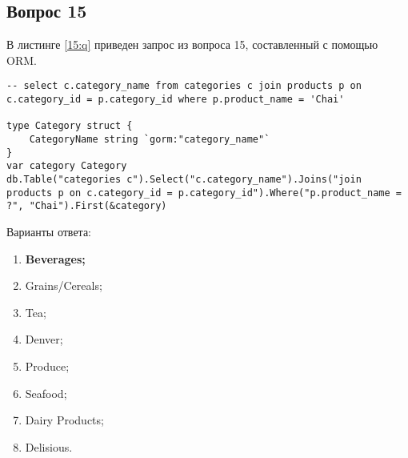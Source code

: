 \begin{appendices}
%
%
%
%
%

\section{Вопрос 15}

В листинге \ref{15:q} приведен запрос из вопроса 15, составленный с помощью ORM.

\begin{lstlisting}[label=15:q,caption=Вопрос 15]
-- select c.category_name from categories c join products p on c.category_id = p.category_id where p.product_name = 'Chai'

type Category struct {
	CategoryName string `gorm:"category_name"`
}
var category Category
db.Table("categories c").Select("c.category_name").Joins("join products p on c.category_id = p.category_id").Where("p.product_name = ?", "Chai").First(&category)
\end{lstlisting}

Варианты ответа:

\begin{enumerate}
	\item \textbf{Beverages;}
	\item Grains/Cereals;
	\item Tea;
	\item Denver;
	\item Produce;
	\item Seafood;
	\item Dairy Products;
	\item Delisious.
\end{enumerate}


\end{appendices}
